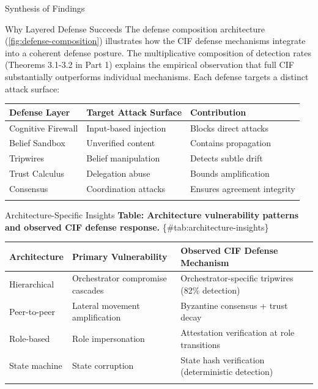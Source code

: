 \documentclass[
  ignorenonframetext,
]{beamer}
\newcounter{none} %
\begin{document}
\begin{frame}{Synthesis of Findings}
\begin{block}{Why Layered Defense Succeeds}
The defense composition architecture (\cref{fig:defense-composition})
illustrates how the CIF defense mechanisms integrate into a coherent
defense posture. The multiplicative composition of detection rates
(Theorems 3.1-3.2 in Part 1) explains the empirical observation that
full CIF substantially outperforms individual mechanisms. Each defense
targets a distinct attack surface:

{\def\LTcaptype{none} %
\begin{longtable}[]{@{}lll@{}}
\toprule\noalign{}
Defense Layer & Target Attack Surface & Contribution \\
\midrule\noalign{}
\endhead
Cognitive Firewall & Input-based injection & Blocks direct attacks \\
Belief Sandbox & Unverified content & Contains propagation \\
Tripwires & Belief manipulation & Detects subtle drift \\
Trust Calculus & Delegation abuse & Bounds amplification \\
Consensus & Coordination attacks & Ensures agreement integrity \\
\bottomrule\noalign{}
\end{longtable}
}
\end{block}

\begin{block}{Architecture-Specific Insights}
\protect{}\label{architecture-specific-insights}
\textbf{Table: Architecture vulnerability patterns and observed CIF
defense response.} \{\#tab:architecture-insights\}

{\def\LTcaptype{none} %
\begin{longtable}[]{@{}
  >{\raggedright\arraybackslash}p{}
  >{\raggedright\arraybackslash}p{}
  >{\raggedright\arraybackslash}p{}@{}}
\toprule\noalign{}
\begin{minipage}[b]{\linewidth}\raggedright
Architecture
\end{minipage} & \begin{minipage}[b]{\linewidth}\raggedright
Primary Vulnerability
\end{minipage} & \begin{minipage}[b]{\linewidth}\raggedright
Observed CIF Defense Mechanism
\end{minipage} \\
\midrule\noalign{}
\endhead
Hierarchical & Orchestrator compromise cascades & Orchestrator-specific
tripwires (82\% detection) \\
Peer-to-peer & Lateral movement amplification & Byzantine consensus +
trust decay \\
Role-based & Role impersonation & Attestation verification at role
transitions \\
State machine & State corruption & State hash verification
(deterministic detection) \\
\bottomrule\noalign{}
\end{longtable}
}


\end{block}
\end{frame}
\end{document}
